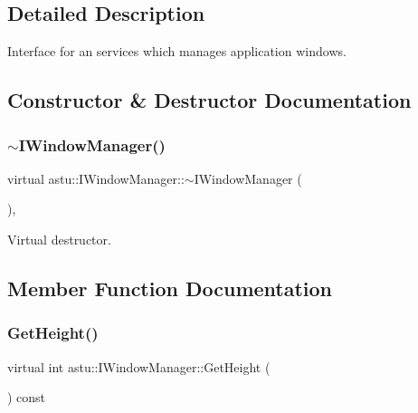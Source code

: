 \subsection{Detailed Description}
Interface for an services which manages application windows. 

\subsection{Constructor \& Destructor Documentation}
\mbox{\label{classastu_1_1IWindowManager_a45f1d28db89ccec4e773aaaf891d9d7b}} 
\subsubsection{\texorpdfstring{$\sim$\+I\+Window\+Manager()}{~IWindowManager()}}
{\footnotesize\ttfamily virtual astu\+::\+I\+Window\+Manager\+::$\sim$\+I\+Window\+Manager (\begin{DoxyParamCaption}{ }\end{DoxyParamCaption})\hspace{0.3cm}{\ttfamily [inline]}, {\ttfamily [virtual]}}

Virtual destructor. 

\subsection{Member Function Documentation}
\mbox{\label{classastu_1_1IWindowManager_a80a146779e21437e8c6ef78889389dfc}} 
\subsubsection{\texorpdfstring{Get\+Height()}{GetHeight()}}
{\footnotesize\ttfamily virtual int astu\+::\+I\+Window\+Manager\+::\+Get\+Height (\begin{DoxyParamCaption}{ }\end{DoxyParamCaption}) const\hspace{0.3cm}{\ttfamily [pure virtual]}}

